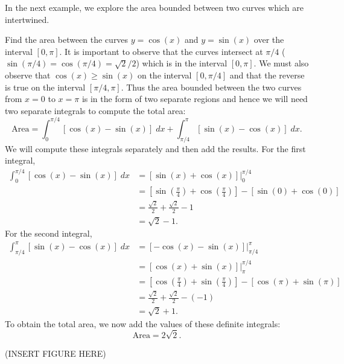 \documentclass{ximera}
\begin{document}
In the next example, we explore the area bounded between two curves which are intertwined.

\begin{example}
Find the area between the curves $y = \cos(x)$ and $y=\sin(x)$ over the interval $[0, \pi]$.
It is important to observe that the curves intersect at $\pi/4$  
($\sin(\pi/4) = \cos(\pi/4) = \sqrt2 / 2$) which is in the interval $[0, \pi]$. 
We must also observe that $\cos(x) \geq \sin(x)$ on the interval $[0, \pi/4]$ and
that the reverse is true on the interval $[\pi/4, \pi]$.
Thus the area bounded between the two curves from $x = 0$ to $x = \pi$ is in the form of two separate regions and hence 
we will need two separate integrals to compute the total area:
\[
\text{Area} = \int_0^{\pi/4} \left[\cos(x) - \sin(x)\right] \; dx + \int_{\pi/4}^\pi \left[\sin(x) -\cos(x)\right] \; dx.
\]
We will compute these integrals separately and then add the results.
For the first integral,
\begin{align*}
\int_0^{\pi/4} \left[\cos(x) - \sin(x)\right] \; dx &= \left[\sin(x) + \cos(x)\right]\bigg|_0^{\pi/4}\\
                                                    &= \left[\sin(\tfrac{\pi}{4}) + \cos(\tfrac{\pi}{4})\right]-\left[\sin(0) + \cos(0)\right]\\
                                                    &= \tfrac{\sqrt 2}{2} + \tfrac{\sqrt 2}{2} - 1\\
                                                    &= \sqrt{2} - 1.
\end{align*}
For the second integral,
\begin{align*}
\int_{\pi/4}^\pi \left[\sin(x) -\cos(x)\right] \; dx &= \left[-\cos(x) - \sin(x) \right]\bigg|_{\pi/4}^{\pi} \\
                                                     &= \left[\cos(x) + \sin(x)\right]\bigg|_{\pi}^{\pi/4}\\
                                                     &= \left[\cos(\tfrac{\pi}{4}) + \sin(\tfrac{\pi}{4})\right]-\left[\cos(\pi) + \sin(\pi)\right]\\
                                                     &= \tfrac{\sqrt 2}{2} + \tfrac{\sqrt 2}{2} - (-1)\\
                                                     &= \sqrt{2} + 1.
\end{align*}                                             
To obtain the total area, we now add the values of these definite integrals:
\[
\text{Area} = 2\sqrt{2}.
\]

(INSERT FIGURE HERE)


\end{example}
\end{document}
